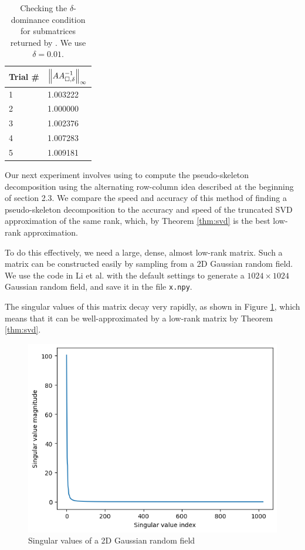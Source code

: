 \documentclass{article}
\begin{document}
	\begin{table}[h]
		\centering
		\begin{tabular}{@{}ll@{}}
			\toprule
			Trial \# & $\left\lVert AA_{\square,\delta}^{-1} \right\rVert_\infty$ \\
			\midrule
			1 & 1.003222\\
			2 & 1.000000\\
			3 & 1.002376\\
			4 & 1.007283\\
			5 & 1.009181\\
			\bottomrule
		\end{tabular}
		\caption{Checking the $\delta$-dominance condition for submatrices returned by \maxvol{}. We use $\delta = 0.01$.}
		\label{table:delta_dominance}
	\end{table}
	
	
	Our next experiment involves using \maxvol{} to compute the pseudo-skeleton decomposition using the alternating row-column idea described at the beginning of section 2.3. We compare the speed and accuracy of this method of finding a pseudo-skeleton decomposition to the accuracy and speed of the truncated SVD approximation of the same rank, which, by Theorem \ref{thm:svd} is the best low-rank approximation.
	
	To do this effectively, we need a large, dense, almost low-rank matrix. Such a matrix can be constructed easily by sampling from a 2D Gaussian random field. We use the code in Li et al. \cite{li_2023a} with the default settings to generate a $1024\times 1024$ Gaussian random field, and save it in the file \texttt{x.npy}.
	
	The singular values of this matrix decay very rapidly, as shown in Figure \ref{fig:singular_values}, which means that it can be well-approximated by a low-rank matrix by Theorem \ref{thm:svd}.
	\begin{figure}[h]
		\centering
		\includegraphics[width=0.5\linewidth]{singular_values.png}
		\caption{Singular values of a 2D Gaussian random field}
		\label{fig:singular_values}
	\end{figure}
	
\end{document}
